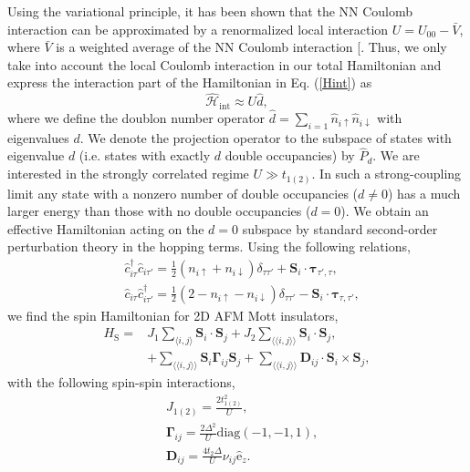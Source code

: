 \documentclass[aps,prl,twocolumn,amsmath,amssymb,nobibnotes]{revtex4-1}%
\renewcommand{\cite}[1]{{[}\onlinecite{#1}{]}}
\newcommand{\n}{\nonumber}
\newcommand{\bs}{\boldsymbol}
\begin{document}
Using the variational principle, it has been shown that the NN Coulomb interaction can be approximated by a renormalized local interaction $U =U_{00} - \bar{V}$, where $\bar{V}$ is a weighted average of the NN Coulomb interaction \cite{Schuler2013,Stepanov2017}. Thus, we only take into account the local Coulomb interaction in our total Hamiltonian and express the interaction part of the Hamiltonian in Eq. (\ref{Hint}) as
\begin{equation}
\hat{\mathcal{H}}_{\text{int}} \approx U\hat{d},
\end{equation}
where we define the doublon number operator $\hat{d} = \sum_{i=1} \hat{n}_{i\uparrow}\hat{n}_{i\downarrow}$ with eigenvalues $d$. We denote the projection operator to the subspace of states with eigenvalue $d$ (i.e. states with exactly $d$ double occupancies) by $\hat{P}_d$. We are interested in the strongly correlated regime $U\gg t_{1(2)}$. In such a strong-coupling limit any state with a nonzero number of double occupancies ($d \neq 0$) has a much larger energy than those with no double occupancies ($d=0$). We obtain an effective Hamiltonian acting on the $d=0$ subspace by standard second-order perturbation theory in the hopping terms. Using the following relations,
\begin{align}
&\hat{c}_{i \tau}^\dagger \hat{c}_{i \tau'} = \frac{1}{2} (n_{i \uparrow} + n_{i \downarrow})\delta_{\tau \tau'}  + \bs{S}_i\cdot\bs{\tau}_{\tau', \tau}, \label{SpinOperatorInv1}\\
&\hat{c}_{i \tau} \hat{c}_{i \tau'}^\dagger = \frac{1}{2} (2 - n_{i \uparrow} - n_{i \downarrow}) \delta_{\tau \tau'} - \bs{S}_i\cdot\bs{\tau}_{\tau, \tau'}, \label{SpinOperatorInv2}
\end{align}
we find the spin Hamiltonian for 2D AFM Mott insulators,
\begin{align}
\label{MKMHeff0}
H_{\text{S}} =& J_{1}\sum_{\langle i,j \rangle} \bs{S}_i\cdot\bs{S}_j + J_{2}\sum_{\langle \langle i,j \rangle \rangle} \bs{S}_i\cdot\bs{S}_j,  \n \\
&+ \sum_{\langle \langle i,j \rangle \rangle} \bs{S}_i \bs{\Gamma}_{ij} \bs{S}_j +\sum_{\langle \langle i,j \rangle \rangle} \bs{D}_{ij}\cdot \bs{S}_i \times \bs{S}_j,
\end{align}
with the following spin-spin interactions,
\begin{subequations}
\label{spin-para}
\begin{align}
&J_{1(2)} = \frac{2t_{1(2)}^2}{U}, \\
&\bs{\Gamma}_{ij} =\frac{2\Delta^2}{U} \text{diag}(-1,-1,1),\\
&\bs{D}_{ij} = \frac{4 t_2 \Delta}{U}\nu_{ij}  \hat{\mathrm{e}}_z.
\end{align}
\end{subequations}
\end{document}
